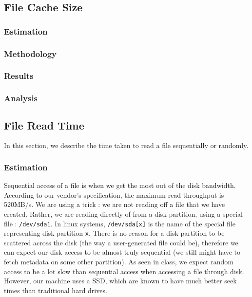 \subsection{File Cache Size}

\subsubsection{Estimation}

\subsubsection{Methodology}

\subsubsection{Results}

\subsubsection{Analysis}

\subsection{File Read Time}

In this section, we describe the time taken to read a file sequentially or randomly.

\subsubsection{Estimation}

Sequential access of a file is when we get the most out of the disk bandwidth. According to our vendor's specification, the maximum read throughput is 520MB/s. We are using a trick : we are not reading off a file that we have created. Rather, we are reading directly of from a disk partition, using a special file : \texttt{/dev/sda1}. In linux systems, \texttt{/dev/sda[x]} is the name of the special file representing disk partition \texttt{x}. There is no reason for a disk partition to be scattered across the disk (the way a user-generated file could be), therefore we can expect our disk access to be almost truly sequential (we still might have to fetch metadata on some other partition). As seen in class, we expect random access to be a lot slow than sequential access when accessing a file through disk. However, our machine uses a SSD, which are known to have much better seek times than traditional hard drives. 

